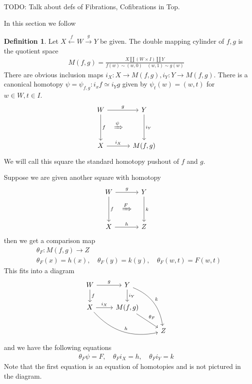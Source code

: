 \documentclass{scrartcl}
\theoremstyle{plain}
\theoremstyle{definition}
\newtheorem{definition}[theorem]{Definition}
\renewcommand{\coprod}{\mathbin{\amalg}}
\begin{document}
TODO: Talk about defs of Fibrations, Cofibrations in Top.

In this section we follow \cite[1.2]{may2011more}
\begin{definition}
    Let $X\xleftarrow{f}W\xrightarrow{g}Y$ be given. The double mapping cylinder of $f, g$ is the quotient space
    \begin{align*}
        M(f, g) = \frac{X\coprod(W\times I)\coprod Y}{f(w)\sim (w,0)\quad (w, 1)\sim g(w)}
    \end{align*}
    There are obvious inclusion maps $i_X\colon X\to M(f, g), i_Y\colon Y\to M(f, g)$. There is a canonical homotopy $\psi=\psi_{f, g}\colon i_xf\simeq i_Yg$ given by $\psi_t(w) = (w, t)$ for $w\in W, t\in I$. 
    \begin{equation}
        \begin{tikzcd}[column sep=.2cm, row sep=.2cm]
            W \arrow[rr,"g"]\arrow[dd,"f"] && Y \arrow[dd, "i_Y"] \\
            & \xRightarrow{\psi} & \\
            X \arrow[rr, "i_X"] && M(f, g)
        \end{tikzcd}
    \end{equation}
    We will call this square the standard homotopy pushout of $f$ and $g$.
\end{definition}

Suppose we are given another square with homotopy
\begin{equation}\label{diag:square_with_homotopy}
    \begin{tikzcd}[column sep=.2cm, row sep=.2cm]
        W \arrow[rr,"g"]\arrow[dd,"f"] && Y \arrow[dd, "k"] \\
        & \xRightarrow{F} & \\
        X \arrow[rr, "h"] && Z
    \end{tikzcd}
\end{equation}
then we get a comparison map 
\begin{align*}
    &\theta_F\colon M(f,g)\to Z \\
    &\theta_F(x) = h(x), \quad \theta_F(y) = k(y), \quad \theta_F(w, t) = F(w, t)
\end{align*}
This fits into a diagram
\begin{equation}
    \begin{tikzcd}
    W \ar[r, "g"] \ar[d, "f"]  &  Y \ar[d, "i_Y"] \ar[ddr, bend left, "k"]  & \\
    X \ar[r, "i_X"] \ar[drr, bend right, "h"]  &  M(f, g) \ar[dr, "\theta_F"]  &  \\
    &  &  Z
\end{tikzcd}
\end{equation}
and we have the following equations
\begin{align*}
    \theta_F \psi = F, \quad \theta_F i_X = h, \quad \theta_F i_Y = k
\end{align*}
Note that the first equation is an equation of homotopies and is not pictured in the diagram. 
\end{document}
